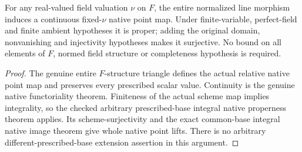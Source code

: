 \begin{theorem}
\label{scheme:normalized-line-native-map}
\leanok
{}
For any real-valued field valuation $\nu$ on $F$, the entire normalized
line morphism induces a continuous fixed-$\nu$ native point map. Under
finite-variable, perfect-field and finite ambient hypotheses it is
proper; adding the original domain, nonvanishing and injectivity
hypotheses makes it surjective. No bound on all elements of $F$, normed
field structure or completeness hypothesis is required.
\end{theorem}
\begin{proof}
The genuine entire $F$-structure triangle defines the actual relative
native point map and preserves every prescribed scalar value. Continuity
is the genuine native functoriality theorem. Finiteness of the actual
scheme map implies integrality, so the checked arbitrary prescribed-base
integral native properness theorem applies. Its scheme-surjectivity and
the exact common-base integral native image theorem give whole native
point lifts. There is no arbitrary different-prescribed-base extension
assertion in this argument.
\end{proof}

